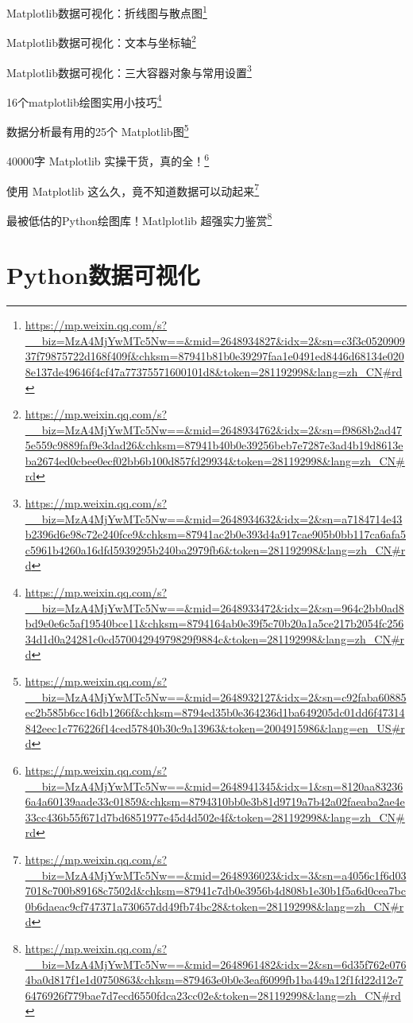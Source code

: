 \documentclass[]{ctexbook}
\renewcommand{\href}[2]{#2\footnote{\url{#1}}}
\begin{document}
\href{https://mp.weixin.qq.com/s?__biz=MzA4MjYwMTc5Nw==\&mid=2648934827\&idx=2\&sn=c3f3c052090937f79875722d168f409f\&chksm=87941b81b0e39297faa1e0491ed8446d68134e0208e137de49646f4cf47a77375571600101d8\&token=281192998\&lang=zh_CN\#rd}{Matplotlib数据可视化：折线图与散点图}

\href{https://mp.weixin.qq.com/s?__biz=MzA4MjYwMTc5Nw==\&mid=2648934762\&idx=2\&sn=f9868b2ad475e559c9889faf9e3dad26\&chksm=87941b40b0e39256beb7e7287e3ad4b19d8613eba2674ed0cbee0ecf02bb6b100d857fd29934\&token=281192998\&lang=zh_CN\#rd}{Matplotlib数据可视化：文本与坐标轴}

\href{https://mp.weixin.qq.com/s?__biz=MzA4MjYwMTc5Nw==\&mid=2648934632\&idx=2\&sn=a7184714e43b2396d6e98c72e240fce9\&chksm=87941ac2b0e393d4a917cae905b0bb117ca6afa5c5961b4260a16dfd5939295b240ba2979fb6\&token=281192998\&lang=zh_CN\#rd}{Matplotlib数据可视化：三大容器对象与常用设置}

\href{https://mp.weixin.qq.com/s?__biz=MzA4MjYwMTc5Nw==\&mid=2648933472\&idx=2\&sn=964c2bb0ad8bd9e0e6c5af19540bce11\&chksm=8794164ab0e39f5c70b20a1a5ce217b2054fc25634d1d0a24281c0cd57004294979829f9884c\&token=281192998\&lang=zh_CN\#rd}{​16个matplotlib绘图实用小技巧}

\href{https://mp.weixin.qq.com/s?__biz=MzA4MjYwMTc5Nw==\&mid=2648932127\&idx=2\&sn=c92faba60885ec2b585b6cc16db1266f\&chksm=8794ed35b0e364236d1ba649205dc01dd6f47314842eec1c776226f14ced57840b30c9a13963\&token=2004915986\&lang=en_US\#rd}{数据分析最有用的25个 Matplotlib图}

\href{https://mp.weixin.qq.com/s?__biz=MzA4MjYwMTc5Nw==\&mid=2648941345\&idx=1\&sn=8120aa832366a4a60139aade33c01859\&chksm=8794310bb0e3b81d9719a7b42a02faeaba2ae4e33cc436b55f671d7bd6851977e45d4d502e4f\&token=281192998\&lang=zh_CN\#rd}{40000字 Matplotlib 实操干货，真的全！}

\href{https://mp.weixin.qq.com/s?__biz=MzA4MjYwMTc5Nw==\&mid=2648936023\&idx=3\&sn=a4056c1f6d037018c700b89168c7502d\&chksm=87941c7db0e3956b4d808b1e30b1f5a6d0cea7bc0b6daeac9cf747371a730657dd49fb74bc28\&token=281192998\&lang=zh_CN\#rd}{使用 Matplotlib 这么久，竟不知道数据可以动起来}

\href{https://mp.weixin.qq.com/s?__biz=MzA4MjYwMTc5Nw==\&mid=2648961482\&idx=2\&sn=6d35f762e0764ba0d817f1e1d0750863\&chksm=879463e0b0e3eaf6099fb1ba449a12f1fd22d12e76476926f779bae7d7ecd6550fdca23cc02e\&token=281192998\&lang=zh_CN\#rd}{最被低估的Python绘图库！Matlplotlib 超强实力鉴赏}

\hypertarget{pythonux6570ux636eux53efux89c6ux5316}{%
\section{Python数据可视化}\label{pythonux6570ux636eux53efux89c6ux5316}}
\end{document}
